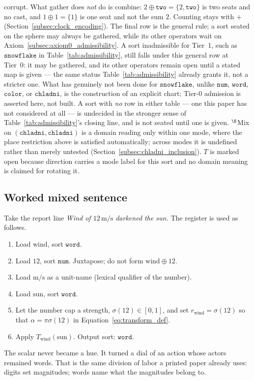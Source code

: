 \documentclass[12pt, a4paper]{article}
\begin{document}
\begin{table}[h]
{corrupt. What gather does \emph{not} do is combine: $2\oplus
\texttt{two}=\{2,\texttt{two}\}$ is two seats and no cast, and
$1\oplus 1=\{1\}$ is one seat and not the sum $2$. Counting stays with
$+$ (Section~\ref{subsec:clock_encoding}). The final row is the
general rule; a sort seated on the sphere may always be gathered, while
its other operators wait on
Axiom~\ref{subsec:axiom0_admissibility}. A sort inadmissible for
Tier~1, such as $\mathtt{snowflake}$ in
Table~\ref{tab:admissibility}, still falls under this general row at
Tier~0: it may be gathered, and its other operators remain open until
a stated map is given --- the same status Table~\ref{tab:admissibility}
already grants it, not a stricter one. What has genuinely not been
done for $\mathtt{snowflake}$, unlike $\mathtt{num}$, $\mathtt{word}$,
$\mathtt{color}$, or $\mathtt{chladni}$, is the construction of an
explicit chart; Tier-0 admission is asserted here, not built. A sort
with \emph{no} row in either table --- one this paper has not
considered at all --- is undecided in the stronger sense of
Table~\ref{tab:admissibility}'s closing line, and is not seated until
one is given.
$^{\S}$Mix on $(\mathtt{chladni},\mathtt{chladni})$ is a domain
reading only within one mode, where the place restriction above is
satisfied automatically; across modes it is undefined rather than
merely untested (Section~\ref{subsec:chladni_inclusion}). $T$ is
marked open because direction carries a mode label for this sort and
no domain meaning is claimed for rotating it.}
\label{tab:type_table}
\end{table}

\subsection{Worked mixed sentence}
\label{subsec:mixed_sentence}
Take the report line \emph{Wind of $12\,\mathrm{m/s}$ darkened the sun.}
The register is used as follows.

\begin{enumerate}
    \item Load $\mathrm{wind}$, sort $\mathtt{word}$.
    \item Load $12$, sort $\mathtt{num}$. Juxtapose; do not form
          $\mathrm{wind}\oplus 12$.
    \item Load $\mathrm{m/s}$ as a unit-name (lexical qualifier of the
          number).
    \item Load $\mathrm{sun}$, sort $\mathtt{word}$.
    \item Let the number cap a strength,
          $\sigma(12)\in[0,1]$, and set
          $r_{\mathrm{wind}}=\sigma(12)$ so that
          $\alpha=\pi\sigma(12)$ in Equation~\eqref{eq:transform_def}.
    \item Apply $T_{\mathrm{wind}}(\mathrm{sun})$. Output sort:
          $\mathtt{word}$.
\end{enumerate}
The scalar never became a hue. It turned a dial of an action whose
actors remained words. That is the same division of labor a printed
paper already uses: digits set magnitudes; words name what the
magnitudes belong to.
\end{document}
